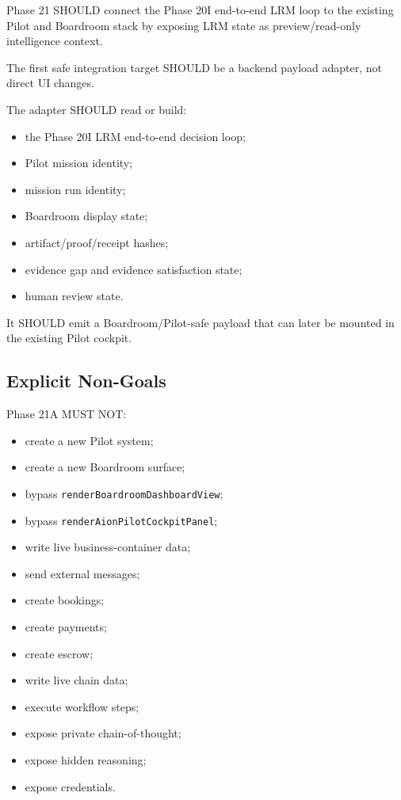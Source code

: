 Phase 21 SHOULD connect the Phase 20I end-to-end LRM loop to the existing Pilot and Boardroom stack by exposing LRM state as preview/read-only intelligence context.

The first safe integration target SHOULD be a backend payload adapter, not direct UI changes.

The adapter SHOULD read or build:

\begin{itemize}
  \item the Phase 20I LRM end-to-end decision loop;
  \item Pilot mission identity;
  \item mission run identity;
  \item Boardroom display state;
  \item artifact/proof/receipt hashes;
  \item evidence gap and evidence satisfaction state;
  \item human review state.
\end{itemize}

It SHOULD emit a Boardroom/Pilot-safe payload that can later be mounted in the existing Pilot cockpit.

\subsection{Explicit Non-Goals}

Phase 21A MUST NOT:

\begin{itemize}
  \item create a new Pilot system;
  \item create a new Boardroom surface;
  \item bypass \texttt{renderBoardroomDashboardView};
  \item bypass \texttt{renderAionPilotCockpitPanel};
  \item write live business-container data;
  \item send external messages;
  \item create bookings;
  \item create payments;
  \item create escrow;
  \item write live chain data;
  \item execute workflow steps;
  \item expose private chain-of-thought;
  \item expose hidden reasoning;
  \item expose credentials.
\end{itemize}

